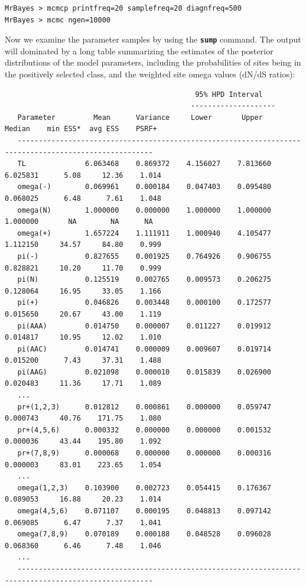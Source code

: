 \documentclass[12pt]{book}
\newcommand{\ttt}[1]{\texttt{#1}}
\newcommand{\tb}[1]{\ttt{\textbf{#1}}}
\begin{document}
\begin{singlespacing}
\small
\begin{verbatim}
MrBayes > mcmcp printfreq=20 samplefreq=20 diagnfreq=500
MrBayes > mcmc ngen=10000
\end{verbatim}
\normalsize
\end{singlespacing}

Now we examine the parameter samples by using the \tb{sump} command. The output will dominated by a
long table summarizing the estimates of the posterior distributions of the model parameters,
including the probabilities of sites being in the positively selected class, and the weighted site
omega values (dN/dS ratios):


\begin{singlespacing}
\tiny
\begin{verbatim}
                                             95% HPD Interval
                                            --------------------
   Parameter         Mean      Variance     Lower       Upper       Median    min ESS*  avg ESS    PSRF+ 
   ------------------------------------------------------------------------------------------------------
   TL              6.063468    0.869372    4.156027    7.813660    6.025831      5.08     12.36    1.014
   omega(-)        0.069961    0.000184    0.047403    0.095480    0.068025      6.48      7.61    1.048
   omega(N)        1.000000    0.000000    1.000000    1.000000    1.000000       NA        NA      NA   
   omega(+)        1.657224    1.111911    1.000940    4.105477    1.112150     34.57     84.80    0.999
   pi(-)           0.827655    0.001925    0.764926    0.906755    0.828821     10.20     11.70    0.999
   pi(N)           0.125519    0.002765    0.009573    0.206275    0.128064     16.95     33.05    1.166
   pi(+)           0.046826    0.003448    0.000100    0.172577    0.015650     20.67     43.00    1.119
   pi(AAA)         0.014750    0.000007    0.011227    0.019912    0.014817     10.95     12.02    1.010
   pi(AAC)         0.014741    0.000009    0.009607    0.019714    0.015200      7.43     37.31    1.488
   pi(AAG)         0.021098    0.000010    0.015839    0.026900    0.020483     11.36     17.71    1.089
   ...
   pr+(1,2,3)      0.012812    0.000861    0.000000    0.059747    0.000743     40.76    171.75    1.080
   pr+(4,5,6)      0.000332    0.000000    0.000000    0.001532    0.000036     43.44    195.80    1.092
   pr+(7,8,9)      0.000068    0.000000    0.000000    0.000316    0.000003     83.01    223.65    1.054
   ...
   omega(1,2,3)    0.103900    0.002723    0.054415    0.176367    0.089053     16.88     20.23    1.014
   omega(4,5,6)    0.071107    0.000195    0.048813    0.097142    0.069085      6.47      7.37    1.041
   omega(7,8,9)    0.070189    0.000188    0.048528    0.096028    0.068360      6.46      7.48    1.046
   ...
   ------------------------------------------------------------------------------------------------------

\end{verbatim}
\normalsize
\end{singlespacing}
\end{document}

